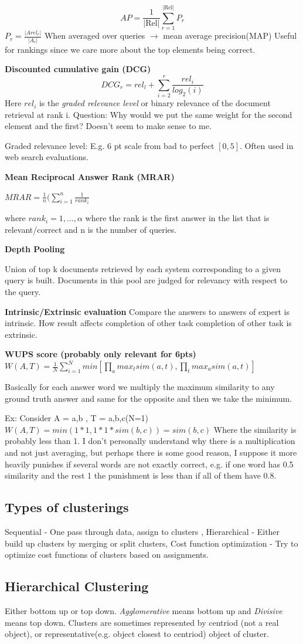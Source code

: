 \documentclass[a4paper,10pt,landscape]{article}
\newcommand{\topic}[1]{\begin{center}\section*{#1}\end{center}}
\begin{document}
\begin{multicols}{3}
$$AP = \frac{1}{|\text{Rel}|}\sum_{r=1}^{|\text{Rel}|}P_r$$
$P_r=\frac{|Arel_r|}{|A_r|}$
When averaged over queries $\xrightarrow{}$ mean average precision(MAP)
Useful for rankings since we care more about the top elements being correct.

\textbf{Discounted cumulative gain (DCG)}
$$DCG_r = rel_l + \sum_{i=2}^{r}\frac{rel_i}{log_2(i)}$$
Here $rel_i$ is the \textit{graded relevance level} or binary relevance of the document retrieval at rank i.
Question: Why would we put the same weight for the second element and the first? Doesn't seem to make sense to me.

Graded relevance level:
E.g. 6 pt scale from bad to perfect $[0,5]$.
Often used in web search evaluations.

\textbf{Mean Reciprocal Answer Rank (MRAR)}

$MRAR = \frac{1}{n}(\sum_{i=1}^{n}\frac{1}{rank_i}$

where $rank_i = 1,...,\alpha$ where the rank is the first answer in the list that is relevant/correct and n is the number of queries.

\textbf{Depth Pooling}

Union of top k documents retrieved by each system corresponding to a given query is built. Documents in this pool are judged for relevancy with respect to the query.

\textbf{Intrinsic/Extrinsic evaluation}
Compare the answers to answers of expert is intrinsic. How result affects completion of other task completion of other task is extrinsic.

\textbf{WUPS score (probably only relevant for 6pts)}
$W(A,T) = \frac{1}{N} \sum_{i=1}^{N}min[\prod_{a}max_tsim(a,t),\prod_tmax_asim(a,t)]$

Basically for each answer word we multiply the maximum similarity to any ground truth answer and same for the opposite and then we take the minimum.

Ex:
Consider A = {a,b} , T = {a,b,c}(N=1)
$W(A,T) = min(1*1,1*1*sim(b,c))=sim(b,c)$
Where the similarity is probably less than 1. I don't personally understand why there is a multiplication and not just averaging, but perhaps there is some good reason, I suppose it more heavily punishes if several words are not exactly correct, e.g. if one word has 0.5 similarity and the rest 1 the punishment is less than if all of them have 0.8.

\topic{Types of clusterings}
Sequential - One pass through data, assign to clusters , Hierarchical - Either build up clusters by merging or split clusters, Cost function optimization - Try to optimize cost functions of clusters based on assignments. 
\topic{Hierarchical Clustering}
Either bottom up or top down. \textit{Agglomerative} means bottom up and \textit{Divisive} means top down.
Clusters are sometimes represented by centriod (not a real object), or representative(e.g. object closest to centriod) object of cluster.


\end{multicols}
\end{document}
